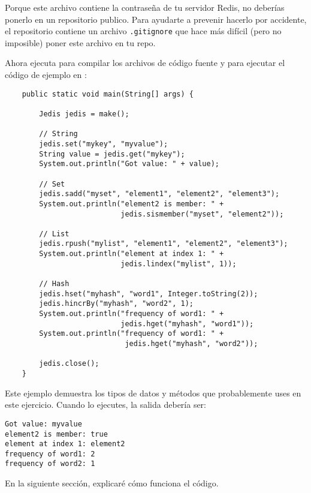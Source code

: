 \documentclass[12pt]{book}
\theoremstyle{exercise}
\begin{document}
Porque este archivo contiene la contraseña de tu servidor Redis, no
deberías ponerlo en un repositorio publico. Para ayudarte a prevenir
hacerlo por accidente, el repositorio contiene un archivo {\tt .gitignore}
que hace más difícil (pero no imposible) poner este archivo en tu repo.


Ahora ejecuta  para compilar los archivos de
código fuente y  para ejecutar el código de ejemplo en
:

\begin{verbatim}
    public static void main(String[] args) {

        Jedis jedis = make();
        
        // String
        jedis.set("mykey", "myvalue");
        String value = jedis.get("mykey");
        System.out.println("Got value: " + value);
        
        // Set
        jedis.sadd("myset", "element1", "element2", "element3");
        System.out.println("element2 is member: " + 
                           jedis.sismember("myset", "element2"));
        
        // List
        jedis.rpush("mylist", "element1", "element2", "element3");
        System.out.println("element at index 1: " + 
                           jedis.lindex("mylist", 1));
        
        // Hash
        jedis.hset("myhash", "word1", Integer.toString(2));
        jedis.hincrBy("myhash", "word2", 1);
        System.out.println("frequency of word1: " + 
                           jedis.hget("myhash", "word1"));
        System.out.println("frequency of word1: " + 
                            jedis.hget("myhash", "word2"));
        
        jedis.close();
    }
\end{verbatim}

Este ejemplo demuestra los tipos de datos y métodos que probablemente uses
en este ejercicio. Cuando lo ejecutes, la salida debería ser:

\begin{verbatim}
Got value: myvalue
element2 is member: true
element at index 1: element2
frequency of word1: 2
frequency of word2: 1
\end{verbatim}

En la siguiente sección, explicaré cómo funciona el código.


\newcommand{\redis}{\textit}
\end{document}
